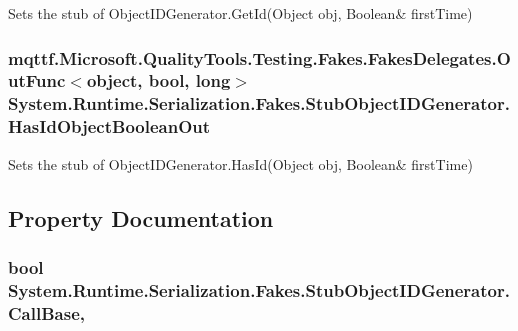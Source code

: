 Sets the stub of Object\-I\-D\-Generator.\-Get\-Id(Object obj, Boolean\& first\-Time)

\hypertarget{class_system_1_1_runtime_1_1_serialization_1_1_fakes_1_1_stub_object_i_d_generator_ab19f594ab5660e56975441eff3e34bd9}{
\subsubsection[{Has\-Id\-Object\-Boolean\-Out}]{\setlength{\rightskip}{0pt plus 5cm}mqttf.\-Microsoft.\-Quality\-Tools.\-Testing.\-Fakes.\-Fakes\-Delegates.\-Out\-Func$<$object, bool, long$>$ System.\-Runtime.\-Serialization.\-Fakes.\-Stub\-Object\-I\-D\-Generator.\-Has\-Id\-Object\-Boolean\-Out}}\label{class_system_1_1_runtime_1_1_serialization_1_1_fakes_1_1_stub_object_i_d_generator_ab19f594ab5660e56975441eff3e34bd9}


Sets the stub of Object\-I\-D\-Generator.\-Has\-Id(Object obj, Boolean\& first\-Time)



\subsection{Property Documentation}
\hypertarget{class_system_1_1_runtime_1_1_serialization_1_1_fakes_1_1_stub_object_i_d_generator_a2c9ba5626209a39c8889586fe94c57d4}{
\subsubsection[{Call\-Base}]{\setlength{\rightskip}{0pt plus 5cm}bool System.\-Runtime.\-Serialization.\-Fakes.\-Stub\-Object\-I\-D\-Generator.\-Call\-Base\hspace{0.3cm}{\ttfamily [get]}, {\ttfamily [set]}}}\label{class_system_1_1_runtime_1_1_serialization_1_1_fakes_1_1_stub_object_i_d_generator_a2c9ba5626209a39c8889586fe94c57d4}



